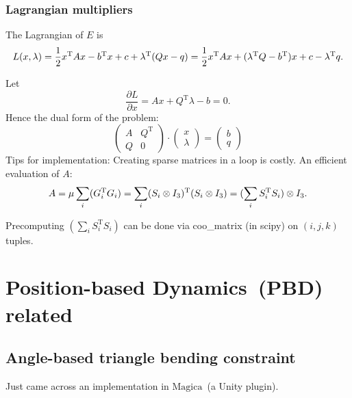 \documentclass{fancydoc}
\begin{document}
\subsubsection{Lagrangian multipliers}
The Lagrangian of $E$ is
\begin{equation}
 L(x, \lambda) = \frac{1}{2} x^\mathrm{T}Ax - b^\mathrm{T}x + c + \lambda^{\mathrm{T}}(Qx - q) \newline = \frac{1}{2} x^\mathrm{T}Ax + ( \lambda^\mathrm{T} Q -b^\mathrm{T})x + c-\lambda^\mathrm{T}q.
\end{equation}

Let
\begin{equation}
\frac{\partial L}{\partial x} = Ax + Q^{\mathrm{T}}\lambda - b = 0.
\end{equation}
Hence the dual form of the problem:
\begin{equation}
\begin{pmatrix} A&Q^{\mathrm{T}} \\ Q & 0 \end{pmatrix} \cdot \begin{pmatrix} x\\ \lambda \end{pmatrix} = 
\begin{pmatrix} b \\ q \end{pmatrix} 
\end{equation}
Tips for implementation:
Creating sparse matrices in a loop is costly. An efficient evaluation of $A$:
\begin{equation}
 A = \mu \sum_i (G^{\mathrm{T}}_iG_i) \newline = \sum_i (S_i \otimes I_3)^\mathrm{T}(S_i \otimes I_3) \newline = (\sum_i S^\mathrm{T}_i S_i) \otimes I_3.
\end{equation}

Precomputing $(\sum_i S^\mathrm{T}_i S_i)$ can be done via coo\_matrix (in scipy) on $(i,j,k)$ tuples.

\section{Position-based Dynamics~(PBD) related}

\subsection{Angle-based triangle bending constraint}

Just came across an implementation in $\mathrm{Magica}$~(a Unity plugin).


 
\end{document}
